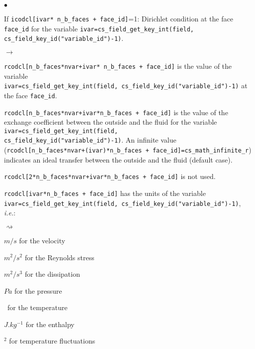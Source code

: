 \begin{list}{$\bullet$}{}
\item If \texttt{icodcl[ivar* n\_b\_faces + face\_id]}=1: Dirichlet condition at the face
      \texttt{face\_id} for the variable \texttt{ivar=cs\_field\_get\_key\_int(field,
       cs\_field\_key\_id("variable\_id")-1)}.

\begin{list}{$\rightarrow$}{}
\item \texttt{rcodcl[n\_b\_faces*nvar+ivar* n\_b\_faces + face\_id]} is the value of the variable\\
       \texttt{ivar=cs\_field\_get\_key\_int(field, cs\_field\_key\_id("variable\_id")-1)}
      at the face \texttt{face\_id}.

\item \texttt{rcodcl[n\_b\_faces*nvar+ivar*n\_b\_faces + face\_id]} is the value of the exchange coefficient
      between the outside and the fluid for the variable \texttt{ivar=cs\_field\_get\_key\_int(field,\\
       cs\_field\_key\_id("variable\_id")-1)}. An
      infinite value (\texttt{rcodcl[n\_b\_faces*nvar+(ivar)*n\_b\_faces + face\_id]=cs\_math\_infinite\_r}) indicates an
      ideal transfer between the outside and the fluid (default case).

\item \texttt{rcodcl[2*n\_b\_faces*nvar+ivar*n\_b\_faces + face\_id]} is not used.

\item \texttt{rcodcl[ivar*n\_b\_faces + face\_id]} has the units of the variable
      \texttt{ivar=cs\_field\_get\_key\_int(field,
       cs\_field\_key\_id("variable\_id")-1)}, {\em i.e.}:
\begin{list}{$\rightsquigarrow$}{}
\item $m/s$ for the velocity

\item $m^2/s^2$ for the Reynolds stress

\item $m^2/s^3$ for the dissipation

\item $Pa$ for the pressure

\item \degresC\ for the temperature

\item $J.kg^{-1}$ for the enthalpy

\item \degresC$^2$ for temperature fluctuations


\end{list}
\end{list}
\end{list}
